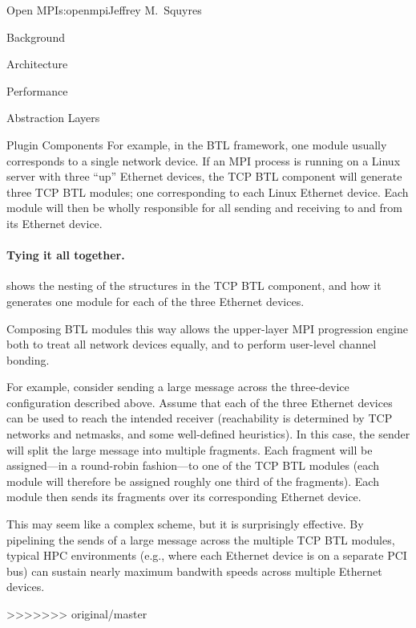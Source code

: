 \begin{aosachapter}{Open MPI}{s:openmpi}{Jeffrey M.\ Squyres}
\begin{aosasect1}{Background}
\begin{aosasect1}{Architecture}
\begin{aosasect2}{Performance}
\begin{aosasect2}{Abstraction Layers}
\begin{aosasect2}{Plugin Components}
For example, in the BTL framework, one module usually corresponds to a
single network device.  
%
If an MPI process is running on a Linux server with three ``up''
Ethernet devices, the TCP BTL component will generate three TCP BTL
modules; one corresponding to each Linux Ethernet device.
%
Each module will then be wholly responsible for all sending and
receiving to and from its Ethernet device.


\paragraph{Tying it all together.}
 shows the nesting of the
structures in the TCP BTL component, and how it generates one module
for each of the three Ethernet devices.


Composing BTL modules this way allows the upper-layer MPI progression
engine both to treat all network devices equally, and to perform
user-level channel bonding.  

For example, consider sending a large message across the three-device
configuration described above.  Assume that each of the three Ethernet
devices can be used to reach the intended receiver (reachability is
determined by TCP networks and netmasks, and some well-defined
heuristics).
%
In this case, the sender will split the large message into multiple
fragments.  Each fragment will be assigned---in a round-robin
fashion---to one of the TCP BTL modules (each module will therefore be
assigned roughly one third of the fragments).
%
Each module then sends its fragments over its corresponding Ethernet
device.

This may seem like a complex scheme, but it is surprisingly
effective.  
%
By pipelining the sends of a large message across the multiple TCP BTL
modules, typical HPC environments (e.g., where each Ethernet device is
on a separate PCI bus) can sustain nearly maximum bandwith speeds
across multiple Ethernet devices.

>>>>>>> original/master
\end{aosasect2}



\end{aosasect2}
\end{aosasect2}
\end{aosasect1}
\end{aosasect1}
\end{aosachapter}
